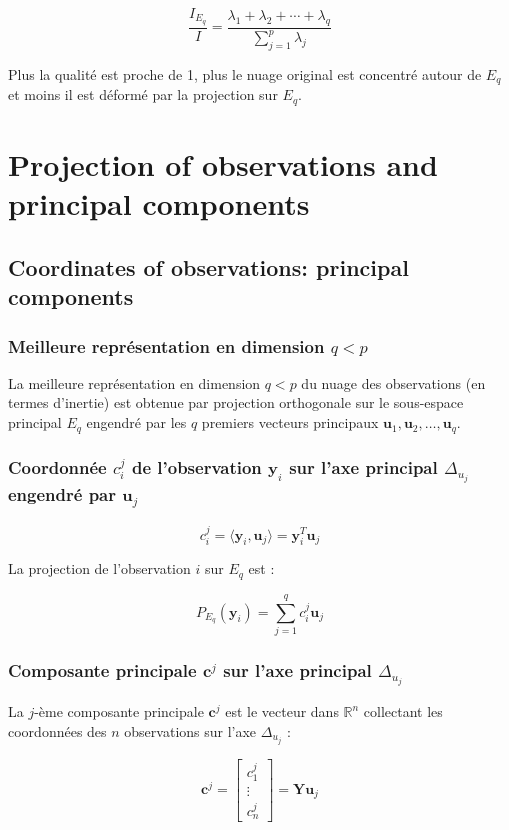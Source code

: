 \documentclass[10pt,a4paper]{article}
\begin{document}
\[
\frac{I_{E_q}}{I} = \frac{\lambda_1 + \lambda_2 + \cdots + \lambda_q}{\sum_{j=1}^p \lambda_j}
\]

Plus la qualité est proche de 1, plus le nuage original est concentré autour de $E_q$ et moins il est déformé par la projection sur $E_q$.

\section*{Projection of observations and principal components}

\subsection*{Coordinates of observations: principal components}
\subsubsection*{Meilleure représentation en dimension $q < p$}
La meilleure représentation en dimension $q < p$ du nuage des observations (en termes d'inertie) est obtenue par projection orthogonale sur le sous-espace principal $E_q$ engendré par les $q$ premiers vecteurs principaux $\mathbf{u}_1, \mathbf{u}_2, \ldots, \mathbf{u}_q$.

\subsubsection*{Coordonnée $c_i^j$ de l'observation $\mathbf{y}_i$ sur l'axe principal $\Delta_{u_j}$ engendré par $\mathbf{u}_j$}
\[
c_i^j = \langle \mathbf{y}_i, \mathbf{u}_j \rangle = \mathbf{y}_i^T \mathbf{u}_j
\]

La projection de l'observation $i$ sur $E_q$ est :

\[
P_{E_q}(\mathbf{y}_i) = \sum_{j=1}^q c_i^j \mathbf{u}_j
\]

\subsubsection*{Composante principale $\mathbf{c}^j$ sur l'axe principal $\Delta_{u_j}$}
La $j$-ème composante principale $\mathbf{c}^j$ est le vecteur dans $\mathbb{R}^n$ collectant les coordonnées des $n$ observations sur l'axe $\Delta_{u_j}$ :

\[
\mathbf{c}^j = \begin{bmatrix}
c_1^j \\
\vdots \\
c_n^j
\end{bmatrix} = \mathbf{Y} \mathbf{u}_j
\]
\end{document}
